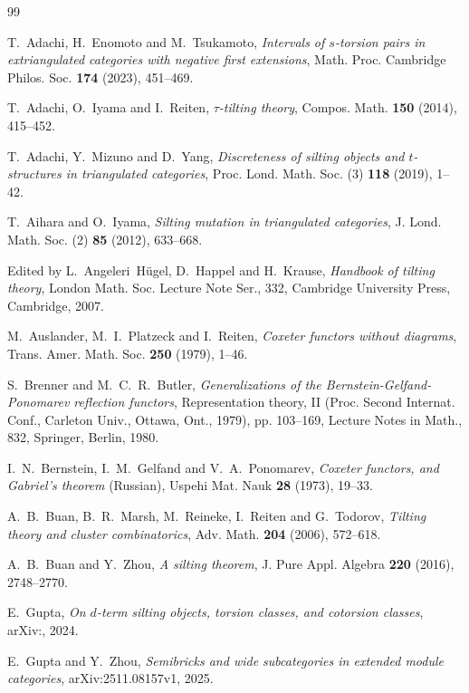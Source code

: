 \documentclass[11pt,a4paper,reqno]{amsart}
\theoremstyle{plain}
\numberwithin{equation}{section}
\theoremstyle{definition}
\begin{document}
\begin{thebibliography}{99}
\enlargethispage{3\baselineskip}
\small

T.~Adachi, H.~Enomoto and M.~Tsukamoto,
\emph{Intervals of $s$-torsion pairs in extriangulated categories with negative first extensions},
Math. Proc. Cambridge Philos. Soc. \textbf{174} (2023), 451--469.

T.~Adachi, O.~Iyama and I.~Reiten,
\emph{$\tau$-tilting theory},
Compos. Math. \textbf{150} (2014), 415--452.

T.~Adachi, Y.~Mizuno and D.~Yang,
\emph{Discreteness of silting objects and $t$-structures in triangulated categories},
Proc. Lond. Math. Soc. (3) \textbf{118} (2019), 1--42.

T.~Aihara and O.~Iyama,
\emph{Silting mutation in triangulated categories},
J. Lond. Math. Soc. (2) \textbf{85} (2012), 633--668.

Edited by L.~Angeleri~H\"ugel, D.~Happel and H.~Krause,
\emph{Handbook of tilting theory},
London Math. Soc. Lecture Note Ser., 332, Cambridge University Press, Cambridge, 2007.

M.~Auslander, M.~I.~Platzeck and I.~Reiten,
\emph{Coxeter functors without diagrams},
Trans. Amer. Math. Soc. \textbf{250} (1979), 1--46.

S.~Brenner and M.~C.~R.~Butler,
\emph{Generalizations of the Bernstein-Gelfand-Ponomarev reflection functors},
Representation theory, II (Proc. Second Internat. Conf., Carleton Univ., Ottawa, Ont., 1979), pp. 103--169, Lecture Notes in Math., 832, Springer, Berlin, 1980.

I.~N.~Bernstein, I.~M.~Gelfand and V.~A.~Ponomarev, 
\emph{Coxeter functors, and Gabriel's theorem} (Russian), Uspehi Mat. Nauk \textbf{28} (1973), 19--33.

A.~B.~Buan, B.~R.~Marsh, M.~Reineke, I.~Reiten and G.~Todorov,
\emph{Tilting theory and cluster combinatorics},
Adv. Math. \textbf{204} (2006), 572--618.

A.~B.~Buan and Y.~Zhou,
\emph{A silting theorem},
J. Pure Appl. Algebra \textbf{220} (2016), 2748--2770.

E.~Gupta,
\emph{On $d$-term silting objects, torsion classes, and cotorsion classes},
arXiv:, 2024.

E.~Gupta and Y.~Zhou,
\emph{Semibricks and wide subcategories in extended module categories},
arXiv:2511.08157v1, 2025.


\end{thebibliography}
\end{document}
